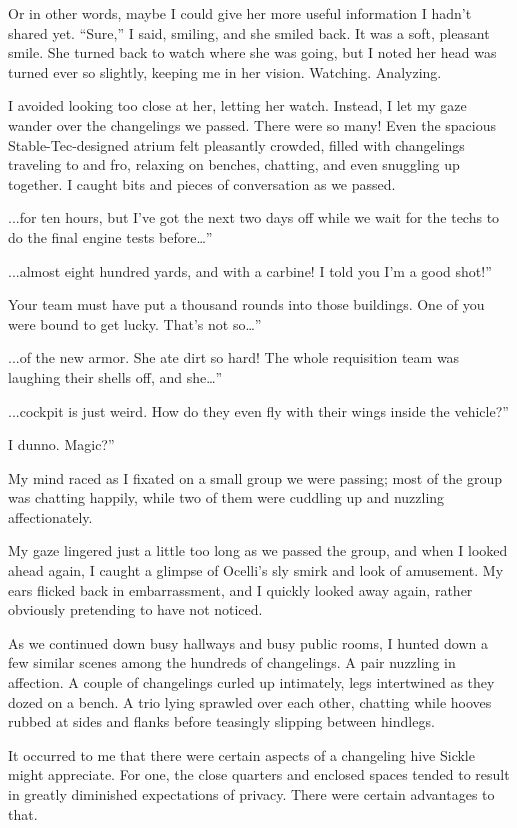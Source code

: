 Or in other words, maybe I could give her more useful information I hadn’t shared yet. “Sure,” I said, smiling, and she smiled back. It was a soft, pleasant smile. She turned back to watch where she was going, but I noted her head was turned ever so slightly, keeping me in her vision. Watching. Analyzing.

I avoided looking too close at her, letting her watch. Instead, I let my gaze wander over the changelings we passed. There were so many! Even the spacious Stable-Tec-designed atrium felt pleasantly crowded, filled with changelings traveling to and fro, relaxing on benches, chatting, and even snuggling up together. I caught bits and pieces of conversation as we passed.

\leavevmode{}...for ten hours, but I’ve got the next two days off while we wait for the techs to do the final engine tests before…”

\leavevmode{}...almost eight hundred yards, and with a carbine! I told you I’m a good shot!”

\leavevmode{}Your team must have put a thousand rounds into those buildings. One of you were bound to get lucky. That’s not so…”

\leavevmode{}...of the new armor. She ate dirt so hard! The whole requisition team was laughing their shells off, and she…”

\leavevmode{}...cockpit is just weird. How do they even fly with their wings inside the vehicle?”

\leavevmode{}I dunno. Magic?”

My mind raced as I fixated on a small group we were passing; most of the group was chatting happily, while two of them were cuddling up and nuzzling affectionately.

My gaze lingered just a little too long as we passed the group, and when I looked ahead again, I caught a glimpse of Ocelli’s sly smirk and look of amusement. My ears flicked back in embarrassment, and I quickly looked away again, rather obviously pretending to have not noticed.

As we continued down busy hallways and busy public rooms, I hunted down a few similar scenes among the hundreds of changelings. A pair nuzzling in affection. A couple of changelings curled up intimately, legs intertwined as they dozed on a bench. A trio lying sprawled over each other, chatting while hooves rubbed at sides and flanks before teasingly slipping between hindlegs.

It occurred to me that there were certain aspects of a changeling hive Sickle might appreciate. For one, the close quarters and enclosed spaces tended to result in greatly diminished expectations of privacy. There were certain advantages to that.

